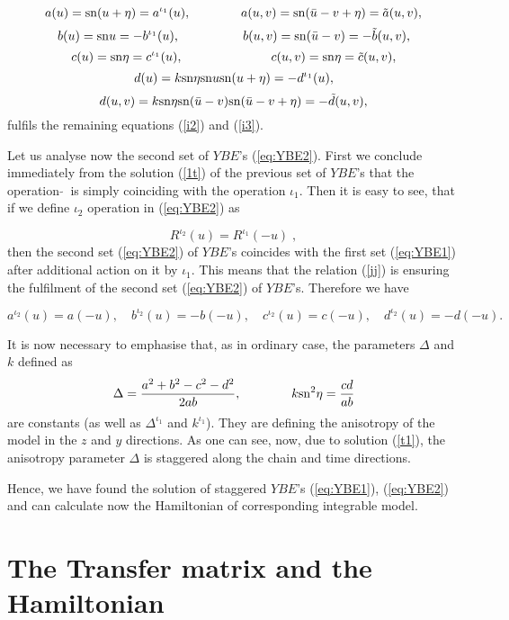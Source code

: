 \documentclass[a4paper,11pt]{article}
\def\sn{{\rm{sn}}}
\begin{document}
$$
a(u)=\sn(u+\eta)=a^{\iota_1}(u),\qquad\qquad a(u,v)=
\sn(\bar u-v+\eta)=\tilde a(u,v),
$$
$$
b(u)=\sn u=-b^{\iota_1}(u),\qquad\qquad\quad b(u,v)=
\sn(\bar u-v)=-\tilde b(u,v),
$$
\begin{equation}
\label{t1}
c(u)=\sn\eta=c^{\iota_1}(u),\qquad\quad\qquad\qquad c(u,v)=
\sn\eta=\tilde c(u,v),
\end{equation}
$$
d(u)=k\sn\eta\sn u\sn(u+\eta)=-d^{\iota_1}(u),
$$
$$
d(u,v)=k\sn\eta \sn(\bar u-v)\sn(\bar u-v+\eta)=-\tilde d(u,v),
$$
fulfils the remaining equations (\ref{i2}) and (\ref{i3}).

Let us analyse now the second set of $YBE$'s (\ref{eq:YBE2}). 
First we conclude immediately from the solution (\ref{1t})
of the previous set of $YBE$'s that the operation  $\tilde{}~$  
is simply coinciding with the operation $\iota_1$.
Then it is easy to see, that if we define $\iota_2$
operation in (\ref{eq:YBE2}) as

\begin{equation}
\label{jj}
R^{\iota_2}(u)=R^{\iota_1}(-u) \;,
\end{equation}
then the second set (\ref{eq:YBE2}) of $YBE$'s 
coincides with the first set (\ref{eq:YBE1}) after additional
action on it by $\iota_1$. This means that the relation (\ref{jj})
is ensuring the fulfilment of the second set (\ref{eq:YBE2})
of $YBE$'s. Therefore we have

\begin{equation}
\label{jjj}
a^{\iota_2}(u)=a(-u),\quad b^{\iota_2}(u)=-b(-u),\quad c^{\iota_2}(u)=c(-u),
\quad d^{\iota_2}(u)=-d(-u).
\end{equation}

It is now necessary to emphasise that, as in ordinary case, the
parameters $\Delta$ and $k$ defined as
\begin{equation}
\label{delta-k}
\Delta=\frac{a^2+b^2-c^2-d^2}{2ab},\qquad \qquad k \sn^2\eta=\frac{cd}{ab}
\end{equation}
are constants (as well as $\Delta^{\iota_1}$ and $k^{\iota_1}$). They are
defining the anisotropy of the model 
in the $z$ and $y$ directions. As one can see, now, due to solution 
(\ref{t1}), the anisotropy parameter $\Delta$ is staggered along the
chain and time directions.

Hence, we have found the solution of staggered $YBE$'s 
(\ref{eq:YBE1}), (\ref{eq:YBE2}) and can calculate
now the Hamiltonian of corresponding integrable model.

\section{The Transfer matrix and the Hamiltonian }
\setcounter{equation}{0}
\end{document}
